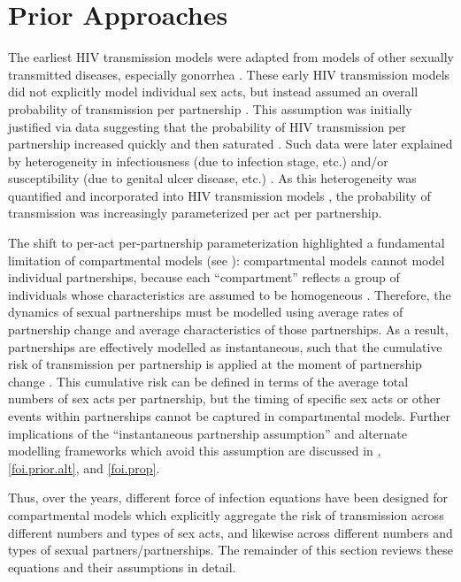 \section{Prior Approaches}\label{foi.prior}
The earliest HIV transmission models \cite{Anderson1986}
were adapted from models of other sexually transmitted diseases,
especially gonorrhea \cite{Yorke1978,Nold1980,Hethcote1982}.
These early HIV transmission models did not explicitly model individual sex acts,
but instead assumed an overall probability of transmission per partnership \cite{Isham1988}.
This assumption was initially justified via data suggesting that
the probability of HIV transmission per partnership
increased quickly and then saturated \cite{Kaplan1990}.
Such data were later explained by heterogeneity in
infectiousness (\eg due to infection stage, etc.) and/or
susceptibility (\eg due to genital ulcer disease, etc.)
\cite{Gray2001,Rottingen2002,Boily2009}.
As this heterogeneity was quantified \cite{Gray2001}
and incorporated into HIV transmission models \cite{Moghadas2003},
the probability of transmission was increasingly parameterized per act \vs per partnership.
\par
The shift to per-act \vs per-partnership parameterization highlighted
a fundamental limitation of compartmental models (see ):
compartmental models cannot model individual partnerships,
because each ``compartment'' reflects a group of individuals
whose characteristics are assumed to be homogeneous \cite{Rao2021}.
Therefore, the dynamics of sexual partnerships must be modelled using
average rates of partnership change and average characteristics of those partnerships.
As a result, partnerships are effectively modelled as instantaneous, such that
the cumulative risk of transmission per partnership
is applied at the moment of partnership change \cite{Dietz1988a}.
This cumulative risk can be defined in terms of
the average total numbers of sex acts per partnership,
but the timing of specific sex acts or other events within partnerships
cannot be captured in compartmental models.
Further implications of the ``instantaneous partnership assumption''
and alternate modelling frameworks which avoid this assumption
are discussed in , \ref{foi.prior.alt}, and \ref{foi.prop}.
\par
Thus, over the years, different force of infection equations
have been designed for compartmental models which
explicitly aggregate the risk of transmission across different numbers and types of sex acts,
and likewise across different numbers and types of sexual partners/partnerships.
The remainder of this section reviews these equations and their assumptions in detail.
